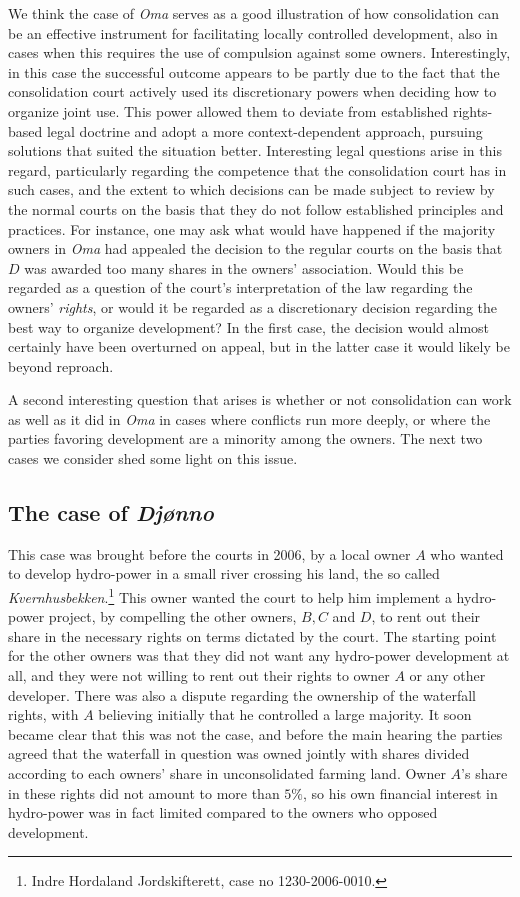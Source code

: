 We think the case of \emph{Oma} serves as a good illustration of how consolidation can be an effective instrument for facilitating locally controlled development, also in cases when this requires the use of compulsion against some owners. Interestingly, in this case the successful outcome appears to be partly due to the fact that the consolidation court actively used its discretionary powers when deciding how to organize joint use. This power allowed them to deviate from established rights-based legal doctrine and adopt a more context-dependent approach, pursuing solutions that suited the situation better. Interesting legal questions arise in this regard, particularly regarding the competence that the consolidation court has in such cases, and the extent to which decisions can be made subject to review by the normal courts on the basis that they do not follow established principles and practices. For instance, one may ask what would have happened if the majority owners in \emph{Oma} had appealed the decision to the regular courts on the basis that $D$ was awarded too many shares in the owners' association. Would this be regarded as a question of the court's interpretation of the law regarding the owners' \emph{rights}, or would it be regarded as a discretionary decision regarding the best way to organize development? In the first case, the decision would almost certainly have been overturned on appeal, but in the latter case it would likely be beyond reproach.

A second interesting question that arises is whether or not consolidation can work as well as it did in \emph{Oma} in cases where conflicts run more deeply, or where the parties favoring development are a minority among the owners. The next two cases we consider shed some light on this issue.

\subsection{The case of \emph{Djønno}}

This case was brought before the courts in 2006, by a local owner $A$ who wanted to develop hydro-power in a small river crossing his land, the so called \emph{Kvernhusbekken}.\footnote{Indre Hordaland Jordskifterett, case no 1230-2006-0010.} This owner wanted the court to help him implement a hydro-power project, by compelling the other owners, $B, C$ and $D$, to rent out their share in the necessary rights on terms dictated by the court. The starting point for the other owners was that they did not want any hydro-power development at all, and they were not willing to rent out their rights to owner $A$ or any other developer. There was also a dispute regarding the ownership of the waterfall rights, with $A$ believing initially that he controlled a large majority. It soon became clear that this was not the case, and before the main hearing the parties agreed that the waterfall in question was owned jointly with shares divided according to each owners' share in unconsolidated farming land. Owner $A$'s share in these rights did not amount to more than $5 \%$, so his own financial interest in hydro-power was in fact limited compared to the owners who opposed development.

